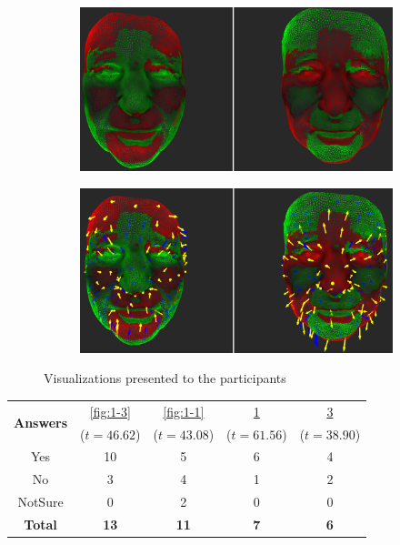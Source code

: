 \begin{figure}[h]
\begin{subfigure}{0.4\textwidth}
\includegraphics[width=\textwidth]{./screenshots/pair2.PNG}
\caption{}
\label{fig:1-2}
\end{subfigure}
\quad
\begin{subfigure}{0.4\textwidth}
\includegraphics[width=\textwidth]{./screenshots/pair4.PNG}
\caption{}
\label{fig:1-4}
\end{subfigure}
\caption{Visualizations presented to the participants}
\end{figure}
\medskip
\begin{center}
\begin{tabular}{| c | c | c | c | c |}
	\hline
\multirow{2}{*}{\bf Answers} & \ref{fig:1-3} & \ref{fig:1-1} & \ref{fig:1-2} & \ref{fig:1-4}\\
	&  (\(t=46.62\)) &  (\(t=43.08\)) &  (\(t=61.56\)) &  (\(t=38.90\))\\ \hline
	Yes & 10 & 5 & 6 & 4\\ \hline
	No & 3 & 4 & 1 & 2\\ \hline
	NotSure & 0 & 2 & 0 & 0\\ \hline
	{\bf Total} & {\bf 13} & {\bf 11} & {\bf 7} & {\bf 6}\\ \hline
\end{tabular}
\end{center}
\clearpage


